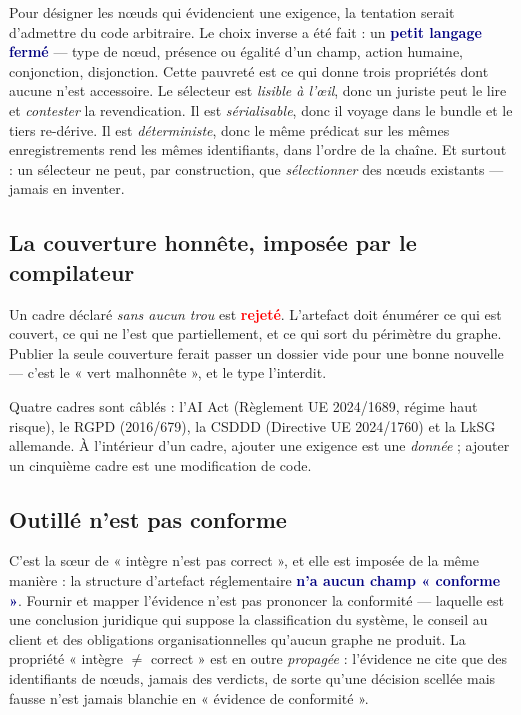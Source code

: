 \documentclass[10pt]{article}
\newcommand{\mm}[1]{\textbf{\textcolor{navy}{#1}}}
\newcommand{\ko}[1]{\textcolor{red}{\textbf{#1}}}
\begin{document}
Pour désigner les nœuds qui évidencient une exigence, la tentation serait d'admettre du code arbitraire. Le choix inverse a été fait : un \mm{petit langage fermé} — type de nœud, présence ou égalité d'un champ, action humaine, conjonction, disjonction. Cette pauvreté est ce qui donne trois propriétés dont aucune n'est accessoire. Le sélecteur est \emph{lisible à l'œil}, donc un juriste peut le lire et \emph{contester} la revendication. Il est \emph{sérialisable}, donc il voyage dans le bundle et le tiers re-dérive. Il est \emph{déterministe}, donc le même prédicat sur les mêmes enregistrements rend les mêmes identifiants, dans l'ordre de la chaîne. Et surtout : un sélecteur ne peut, par construction, que \emph{sélectionner} des nœuds existants — jamais en inventer.

\subsection{La couverture honnête, imposée par le compilateur}

\begin{acquis}
Un cadre déclaré \emph{sans aucun trou} est \ko{rejeté}. L'artefact doit énumérer ce qui est couvert, ce qui ne l'est que partiellement, et ce qui sort du périmètre du graphe. Publier la seule couverture ferait passer un dossier vide pour une bonne nouvelle — c'est le « vert malhonnête », et le type l'interdit.
\end{acquis}

Quatre cadres sont câblés : l'AI Act (Règlement UE 2024/1689, régime haut risque), le RGPD (2016/679), la CSDDD (Directive UE 2024/1760) et la LkSG allemande. À l'intérieur d'un cadre, ajouter une exigence est une \emph{donnée} ; ajouter un cinquième cadre est une modification de code.

\subsection{Outillé n'est pas conforme}

C'est la sœur de « intègre n'est pas correct », et elle est imposée de la même manière : la structure d'artefact réglementaire \mm{n'a aucun champ « conforme »}. Fournir et mapper l'évidence n'est pas prononcer la conformité — laquelle est une conclusion juridique qui suppose la classification du système, le conseil au client et des obligations organisationnelles qu'aucun graphe ne produit. La propriété « intègre $\neq$ correct » est en outre \emph{propagée} : l'évidence ne cite que des identifiants de nœuds, jamais des verdicts, de sorte qu'une décision scellée mais fausse n'est jamais blanchie en « évidence de conformité ».
\end{document}
